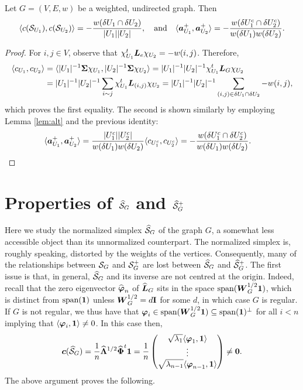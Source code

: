 \begin{lemma}
Let $G=(V,E,w)$ be a weighted, undirected graph. Then 
\begin{equation*}
    \langle c(\mathcal{S}_{U_1}),c(\mathcal{S}_{U_2})\rangle = - \frac{w(\delta U_1\cap \delta U_2)}{|U_1||U_2|},\quad\text{and}\quad \langle \vb*{a}^+_{U_1},\vb*{a}^+_{U_2}\rangle = -\frac{w(\delta U_1^c\cap \delta U_2^c)}{w(\delta U_1)w(\delta U_2)}.
\end{equation*}
\end{lemma}
\begin{proof}
For $i,j\in V$, observe that $\chi_{U_1}^t \vb*{L}_e\chi_{U_2}=-w(i,j)$. Therefore, 
\begin{align*}
    \langle c_{U_1},c_{U_2}\rangle &= \langle |U_1|^{-1}\boldsymbol{\Sigma}\chi_{U_1},|U_2|^{-1}\boldsymbol{\Sigma}\chi_{U_2}\rangle = |U_1|^{-1}|U_2|^{-1} \chi_{U_1}^t \vb*{L}_G\chi_{U_2} \\
    &= |U_1|^{-1}|U_2|^{-1}\sum_{i\sim j} \chi_{U_1}^t \vb*{L}_{(i,j)}\chi_{U_2} = |U_1|^{-1}|U_2|^{-1}\sum_{(i,j)\in \delta U_1\cap \delta U_2} -w(i,j),
\end{align*}
which proves the first equality. The second is shown similarly by employing Lemma \ref{lem:alt} and the previous identity:
\begin{align*}
    \langle \vb*{a}^+_{U_1},\vb*{a}^+_{U_2}\rangle &= \frac{|U_1^c||U_2^c|}{w(\delta U_1) w(\delta U_2)}\langle c_{U_1^c},c_{U_2^c}\rangle
    =-\frac{w(\delta U_1^c\cap \delta U_2^c)}{w(\delta U_1)w(\delta U_2)}.\qedhere
\end{align*}

\end{proof}

\section{Properties of \texorpdfstring{$\widehat{\mathcal{S}}_G$}{the normalized Simplex} and \texorpdfstring{$\widehat{\mathcal{S}}_G^+$}{and its inverse}}
\label{sec:Sn_G}

Here we study the normalized simplex $\widehat{\mathcal{S}}_G$ of the graph $G$, a somewhat less accessible object than its unnormalized counterpart.  The normalized simplex is, roughly speaking, distorted by the weights of the vertices. Consequently, many of the relationships between $\mathcal{S}_G$ and $\mathcal{S}_G^+$ are lost between $\widehat{\mathcal{S}}_G$ and $\widehat{\mathcal{S}}_G^+$. The first issue is that, in general, $\widehat{\mathcal{S}}_G$ and its inverse are not centred at the origin. Indeed, recall that the zero eigenvector $\widehat{\vb*{\varphi}}_n$ of $\widehat{\vb*{L}}_G$ sits in the space $\textnormal{span}(\vb*{W}^{1/2}_G\vb{1})$, which is distinct from $\textnormal{span}(\vb{1})$ unless $\vb*{W}^{1/2}_G=d\vb{I}$ for some $d$, in which case $G$ is regular.
If $G$ is not regular, we thus have that $\vb*{\varphi}_i \in \textnormal{span}(\vb*{W}^{1/2}_G\vb{1})\subseteq \textnormal{span}(\vb{1})^\perp$ for all $i<n$ implying that $\langle \vb*{\varphi}_i,\vb{1}\rangle \neq 0$. In this case then,  
 \[\vb*{c}(\widehat{\mathcal{S}}_G) = \frac{1}{n} \widehat{\vb{\Lambda}}^{1/2}\widehat{\boldsymbol{\Phi}}^t \vb{1} = \frac{1}{n} \begin{pmatrix}
 \sqrt{\lambda_1}\langle \vb*{\varphi}_1,\vb{1}\rangle \\
 \vdots \\
\sqrt{ \lambda_{n-1}}\langle \vb*{\varphi}_{n-1},\vb{1} \rangle
 \end{pmatrix}\neq \vb{0}.\]
The above argument proves the following.

